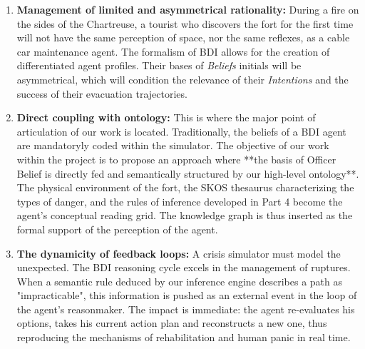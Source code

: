 \documentclass{article}
\begin{document}
\begin{enumerate}
\item \textbf {Management of limited and asymmetrical rationality:} During a fire on the sides of the Chartreuse, a tourist who discovers the fort for the first time will not have the same perception of space, nor the same reflexes, as a cable car maintenance agent. The formalism of BDI allows for the creation of differentiated agent profiles. Their bases of \textit {Beliefs} initials will be asymmetrical, which will condition the relevance of their \textit{Intentions} and the success of their evacuation trajectories.
\item \textbf {Direct coupling with ontology:} This is where the major point of articulation of our work is located. Traditionally, the beliefs of a BDI agent are mandatoryly coded within the simulator. The objective of our work within the project is to propose an approach where **the basis of Officer Belief is directly fed and semantically structured by our high-level ontology**. The physical environment of the fort, the SKOS thesaurus characterizing the types of danger, and the rules of inference developed in Part 4 become the agent's conceptual reading grid. The knowledge graph is thus inserted as the formal support of the perception of the agent.
\item \textbf {The dynamicity of feedback loops:} A crisis simulator must model the unexpected. The BDI reasoning cycle excels in the management of ruptures. When a semantic rule deduced by our inference engine describes a path as "impracticable", this information is pushed as an external event in the loop of the agent's reasonmaker. The impact is immediate: the agent re-evaluates his options, takes his current action plan and reconstructs a new one, thus reproducing the mechanisms of rehabilitation and human panic in real time.
\end{enumerate}
\end{document}
